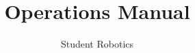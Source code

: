 \documentclass[a4paper]{scrreprt}
\title{Operations Manual}
\author{Student Robotics}
\begin{document}
\maketitle

\tableofcontents









\begin{appendices}

\end{appendices}
\end{document}
